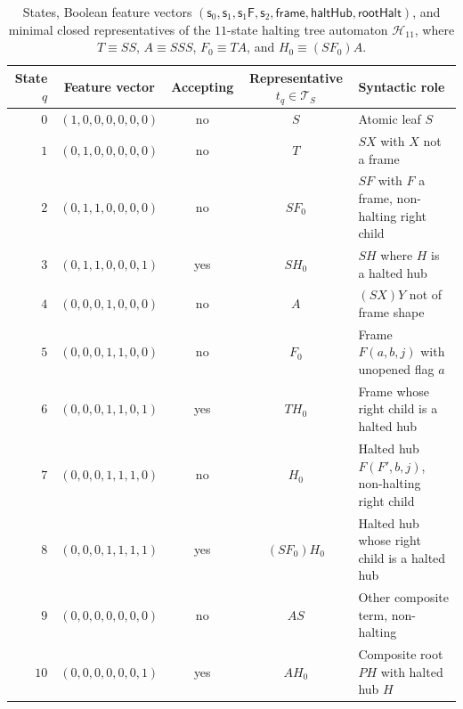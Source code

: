 \documentclass[11pt,reqno]{amsart}
\numberwithin{equation}{section}
\theoremstyle{plain}
\theoremstyle{definition}
\theoremstyle{remark}
\newcommand{\TS}{\mathcal{T}_S}
\begin{document}
\begin{table}[htbp]
\centering
\caption{States, Boolean feature vectors $(\mathsf{s}_0, \mathsf{s}_1, \mathsf{s}_1\mathsf{F}, \mathsf{s}_2, \mathsf{frame}, \mathsf{haltHub}, \mathsf{rootHalt})$, and minimal closed representatives of the $11$-state halting tree automaton $\mathcal{H}_{11}$, where $T \equiv S S$, $A \equiv S S S$, $F_0 \equiv T A$, and $H_0 \equiv (S F_0) A$.}\label{tab:h11}
\small
\begin{tabular}{@{}rcccl@{}}
\toprule
State $q$ & Feature vector & Accepting & Representative $t_q \in \TS$ & Syntactic role \\
\midrule
$0$  & $(1,0,0,0,0,0,0)$ & no  & $S$            & Atomic leaf $S$ \\
$1$  & $(0,1,0,0,0,0,0)$ & no  & $T$            & $S X$ with $X$ not a frame \\
$2$  & $(0,1,1,0,0,0,0)$ & no  & $S F_0$        & $S F$ with $F$ a frame, non-halting right child \\
$3$  & $(0,1,1,0,0,0,1)$ & yes & $S H_0$        & $S H$ where $H$ is a halted hub \\
$4$  & $(0,0,0,1,0,0,0)$ & no  & $A$            & $(S X) Y$ not of frame shape \\
$5$  & $(0,0,0,1,1,0,0)$ & no  & $F_0$          & Frame $F(a,b,j)$ with unopened flag $a$ \\
$6$  & $(0,0,0,1,1,0,1)$ & yes & $T H_0$        & Frame whose right child is a halted hub \\
$7$  & $(0,0,0,1,1,1,0)$ & no  & $H_0$          & Halted hub $F(F', b, j)$, non-halting right child \\
$8$  & $(0,0,0,1,1,1,1)$ & yes & $(S F_0) H_0$  & Halted hub whose right child is a halted hub \\
$9$  & $(0,0,0,0,0,0,0)$ & no  & $A S$          & Other composite term, non-halting \\
$10$ & $(0,0,0,0,0,0,1)$ & yes & $A H_0$        & Composite root $P H$ with halted hub $H$ \\
\bottomrule
\end{tabular}
\end{table}
\end{document}

